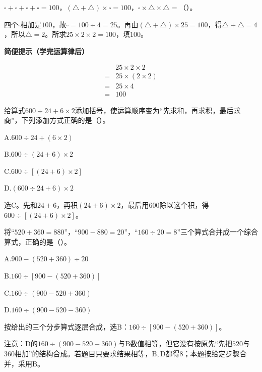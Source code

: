\(\square+\square+\square+\square=100\)，\allowbreak{}\((\triangle+\triangle)\times\square=100\)，\allowbreak{}\(\square\times\triangle\times\triangle=\)（\hspace{1.8em}）。\par
\begin{BookAnswer}
四个\(\square\)相加是\(100\)，故\(\square=100\div4=25\)。再由\((\triangle+\triangle)\times25=100\)，得\(\triangle+\triangle=4\)，所以\(\triangle=2\)。所求\(25\times2\times2=100\)，填\(100\)。\par\textbf{简便提示（学完运算律后）}\par \[\begin{aligned}&25\times2\times2\\={}&25\times(2\times2)\\={}&25\times4\\={}&100\end{aligned}\]
\end{BookAnswer}

给算式\(600\div24+6\times2\)添加括号，使运算顺序变为“先求和，再求积，最后求商”，下列添加方式正确的是（\hspace{1.8em}）。\par
\noindent A.\(600\div24+(6\times2)\)\par
\noindent B.\(600\div(24+6)\times2\)\par
\noindent C.\(600\div[(24+6)\times2]\)\par
\noindent D.\((600\div24+6)\times2\)\par
\begin{BookAnswer}
选\(\mathrm C\)。先和\(24+6\)，再积\((24+6)\times2\)，最后用\(600\)除以这个积，得\(600\div[(24+6)\times2]\)。
\end{BookAnswer}

将“\(520+360=880\)”，“\(900-880=20\)”，“\(160\div20=8\)”三个算式合并成一个综合算式，正确的是（\hspace{1.8em}）。\par
\noindent A.\(900-(520+360)\div20\)\par
\noindent B.\(160\div[900-(520+360)]\)\par
\noindent C.\(160\div(900-520+360)\)\par
\noindent D.\(160\div(900-520-360)\)\par
\begin{BookAnswer}
按给出的三个分步算式逐层合成，选\(\mathrm B\)：\(160\div[900-(520+360)]\)。\par 注意：\(\mathrm D\)的\(160\div(900-520-360)\)与\(\mathrm B\)数值相等，但它没有按原先“先把\(520\)与\(360\)相加”的结构合成。若题目只要求结果相等，\allowbreak{}\(\mathrm B,\mathrm D\)都得\(8\)；本题按给定步骤合并，采用\(\mathrm B\)。
\end{BookAnswer}


